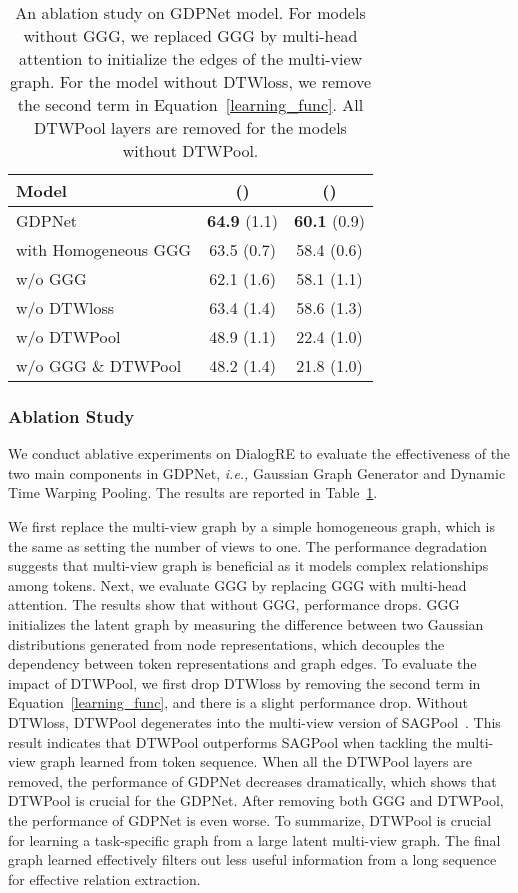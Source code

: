 \documentclass[letterpaper]{article} \usepackage{aaai21}  \usepackage{times}  \usepackage{helvet} \usepackage{courier}  \usepackage[hyphens]{url}  \usepackage{graphicx} \urlstyle{rm} \def\UrlFont{\rm}  \usepackage{graphicx}  \usepackage{natbib}  \usepackage{caption}
\newcommand{\ie}{\emph{i.e.,}\xspace}
\begin{document}
\begin{table}
\small
\centering
\caption{An ablation study on GDPNet model. For models without GGG, we replaced GGG by multi-head attention to initialize the edges of the multi-view graph. For the model without DTWloss, we remove the second term in Equation~\ref{learning_func}. All DTWPool layers are removed for the models without DTWPool.}
\label{tbl-dialogre_a_study}
\begin{tabular}{l|c c}
\toprule
Model                 & ()        & ()       \\ 
\midrule
GDPNet                & \textbf{64.9} (1.1) & \textbf{60.1} (0.9) \\
 with Homogeneous GGG  & 63.5 (0.7)          & 58.4 (0.6) \\
 w/o GGG               & 62.1 (1.6)          & 58.1 (1.1) \\
 w/o DTWloss           & 63.4 (1.4)          & 58.6 (1.3) \\
 w/o DTWPool           & 48.9 (1.1)          & 22.4 (1.0) \\
 w/o GGG \& DTWPool   & 48.2 (1.4)          & 21.8 (1.0) \\ 
\bottomrule
\end{tabular}
\end{table}

\subsubsection{Ablation Study}
We conduct ablative experiments on DialogRE to evaluate the effectiveness of the two main components in GDPNet, \ie Gaussian Graph Generator and Dynamic Time Warping Pooling. The results are reported in Table~\ref{tbl-dialogre_a_study}. 

We first replace the multi-view graph by a simple homogeneous graph, which is the same as setting the number of views to one. The performance degradation suggests that multi-view graph is beneficial as it models complex relationships among tokens. Next, we evaluate GGG by replacing GGG with multi-head attention. The results show that without GGG, performance drops. GGG initializes the latent graph by measuring the difference between two Gaussian distributions generated from node representations, which decouples the dependency between token representations and graph edges. To evaluate the impact of DTWPool, we first drop DTWloss by removing the second term in Equation~\ref{learning_func}, and there is a slight performance drop. Without DTWloss, DTWPool degenerates into the multi-view version of SAGPool~\cite{pmlr-v97-lee19c}. This result indicates that DTWPool outperforms SAGPool when tackling the multi-view graph learned from token sequence. When all the DTWPool layers are removed, the performance of GDPNet decreases dramatically, which shows that DTWPool is crucial for the GDPNet. After removing both GGG and DTWPool, the performance of GDPNet is even worse. To summarize, DTWPool is crucial for learning a task-specific graph from a large latent multi-view graph. The final graph learned effectively filters out less useful information from a long sequence for effective relation extraction.
\end{document}
